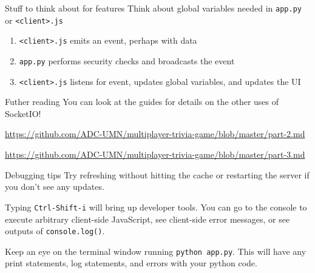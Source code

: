 \documentclass{beamer}
\begin{document}
\begin{frame}{Stuff to think about for features}
	Think about global variables needed in \texttt{app.py} or \texttt{<client>.js} \pause

	\bigskip

	\begin{enumerate}
		\item \texttt{<client>.js} emits an event, perhaps with data \pause
		\item \texttt{app.py} performs security checks and broadcasts the event \pause
		\item \texttt{<client>.js} listens for event, updates global variables, and updates the UI
	\end{enumerate}
\end{frame}

\begin{frame}{Futher reading}
	You can look at the guides for details on the other uses of SocketIO!

	\bigskip

	\href{https://github.com/ADC-UMN/multiplayer-trivia-game/blob/master/part-2.md}{https://github.com/ADC-UMN/multiplayer-trivia-game/blob/master/part-2.md}

	\bigskip

	\href{https://github.com/ADC-UMN/multiplayer-trivia-game/blob/master/part-3.md}{https://github.com/ADC-UMN/multiplayer-trivia-game/blob/master/part-3.md}
\end{frame}

\begin{frame}{Debugging tips}
	Try refreshing without hitting the cache or restarting the server if you don't see any updates. \pause

	\bigskip

	Typing \texttt{Ctrl-Shift-i} will bring up developer tools. You can go to the console to execute arbitrary client-side JavaScript, see client-side error messages, or see outputs of \texttt{console.log()}. \pause

	\bigskip

	Keep an eye on the terminal window running \texttt{python app.py}. This will have any print statements, log statements, and errors with your python code.
\end{frame}
\end{document}
